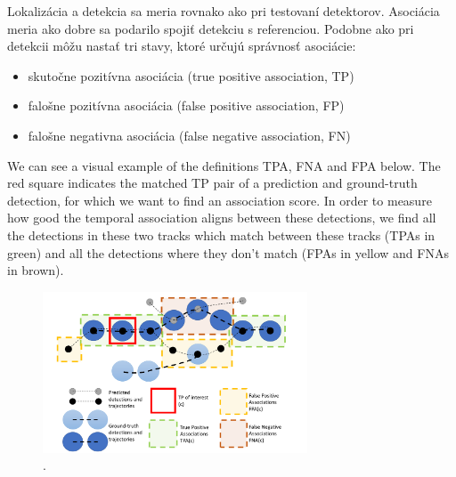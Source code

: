 Lokalizácia a detekcia sa meria rovnako ako pri testovaní detektorov. Asociácia meria ako dobre sa podarilo spojiť detekciu s referenciou. Podobne ako pri detekcii môžu nastať tri stavy, ktoré určujú správnosť asociácie:

\begin{itemize}
  \item skutočne pozitívna asociácia (true positive association, TP)
  \item falošne pozitívna asociácia (false positive association, FP)
  \item falošne negativna asociácia (false negative association, FN)
\end{itemize}


We can see a visual example of the definitions TPA, FNA and FPA below. The red square indicates the matched TP pair of a prediction and ground-truth detection, for which we want to find an association score. In order to measure how good the temporal association aligns between these detections, we find all the detections in these two tracks which match between these tracks (TPAs in green) and all the detections where they don’t match (FPAs in yellow and FNAs in brown).

\begin{figure}[ht]
    \centering
    \includegraphics[width=0.7\textwidth]{images/05/explanation.png}
    \caption{.}
    \label{img:road}
\end{figure}


